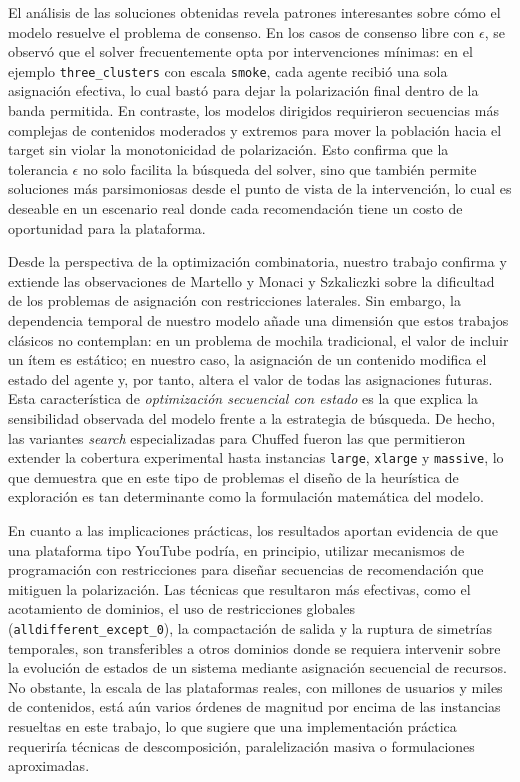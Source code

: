 \documentclass[10pt,letterpaper]{article}
\begin{document}
El an\'alisis de las soluciones obtenidas revela patrones interesantes sobre c\'omo el modelo resuelve el problema de consenso. En los casos de consenso libre con \(\epsilon\), se observ\'o que el solver frecuentemente opta por intervenciones m\'inimas: en el ejemplo \texttt{three\_clusters} con escala \texttt{smoke}, cada agente recibi\'o una sola asignaci\'on efectiva, lo cual bast\'o para dejar la polarizaci\'on final dentro de la banda permitida. En contraste, los modelos dirigidos requirieron secuencias m\'as complejas de contenidos moderados y extremos para mover la poblaci\'on hacia el target sin violar la monotonicidad de polarizaci\'on. Esto confirma que la tolerancia \(\epsilon\) no solo facilita la b\'usqueda del solver, sino que tambi\'en permite soluciones m\'as parsimoniosas desde el punto de vista de la intervenci\'on, lo cual es deseable en un escenario real donde cada recomendaci\'on tiene un costo de oportunidad para la plataforma.

Desde la perspectiva de la optimizaci\'on combinatoria, nuestro trabajo confirma y extiende las observaciones de Martello y Monaci \cite{martello-monaci-2018} y Szkaliczki \cite{szkaliczki2025} sobre la dificultad de los problemas de asignaci\'on con restricciones laterales. Sin embargo, la dependencia temporal de nuestro modelo a\~nade una dimensi\'on que estos trabajos cl\'asicos no contemplan: en un problema de mochila tradicional, el valor de incluir un \'item es est\'atico; en nuestro caso, la asignaci\'on de un contenido modifica el estado del agente y, por tanto, altera el valor de todas las asignaciones futuras. Esta caracter\'istica de \textit{optimizaci\'on secuencial con estado} es la que explica la sensibilidad observada del modelo frente a la estrategia de b\'usqueda. De hecho, las variantes \textit{search} especializadas para Chuffed fueron las que permitieron extender la cobertura experimental hasta instancias \texttt{large}, \texttt{xlarge} y \texttt{massive}, lo que demuestra que en este tipo de problemas el dise\~no de la heur\'istica de exploraci\'on es tan determinante como la formulaci\'on matem\'atica del modelo.

En cuanto a las implicaciones pr\'acticas, los resultados aportan evidencia de que una plataforma tipo YouTube podr\'ia, en principio, utilizar mecanismos de programaci\'on con restricciones para dise\~nar secuencias de recomendaci\'on que mitiguen la polarizaci\'on. Las t\'ecnicas que resultaron m\'as efectivas, como el acotamiento de dominios, el uso de restricciones globales (\texttt{alldifferent\_except\_0}), la compactaci\'on de salida y la ruptura de simetr\'ias temporales, son transferibles a otros dominios donde se requiera intervenir sobre la evoluci\'on de estados de un sistema mediante asignaci\'on secuencial de recursos. No obstante, la escala de las plataformas reales, con millones de usuarios y miles de contenidos, est\'a a\'un varios \'ordenes de magnitud por encima de las instancias resueltas en este trabajo, lo que sugiere que una implementaci\'on pr\'actica requerir\'ia t\'ecnicas de descomposici\'on, paralelizaci\'on masiva o formulaciones aproximadas.
\end{document}
